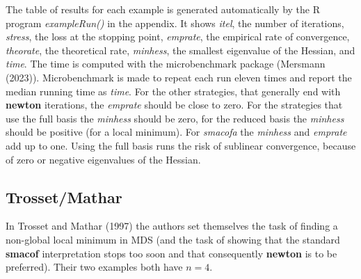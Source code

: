 \documentclass[
  12pt,
]{article}
\begin{document}
The table of results for each example is generated automatically by the R program \emph{exampleRun()}
in the appendix. It shows \emph{itel}, the number of iterations, \emph{stress}, the loss
at the stopping point, \emph{emprate}, the empirical rate of convergence,
\emph{theorate}, the theoretical rate, \emph{minhess}, the smallest eigenvalue of
the Hessian, and \emph{time}. The time is computed with the microbenchmark
package (Mersmann (2023)). Microbenchmark is made to repeat each run eleven times and report the
median running time as \emph{time}. For the other strategies, that
generally end with \textbf{newton} iterations, the \emph{emprate} should be
close to zero.
For the strategies that use the full basis the \emph{minhess} should be zero,
for the reduced basis the \emph{minhess} should be positive (for a local
minimum). For \emph{smacofa} the \emph{minhess} and \emph{emprate} add up to one.
Using the full basis runs the risk of sublinear convergence,
because of zero or negative eigenvalues of the Hessian.

\subsection{Trosset/Mathar}\label{trossetmathar}

In Trosset and Mathar (1997) the authors set themselves the task of finding a non-global
local minimum in MDS (and the task of showing that the standard \textbf{smacof}
interpretation stops too soon and that consequently \textbf{newton} is to be preferred).
Their two examples both have \(n=4\).
\end{document}
